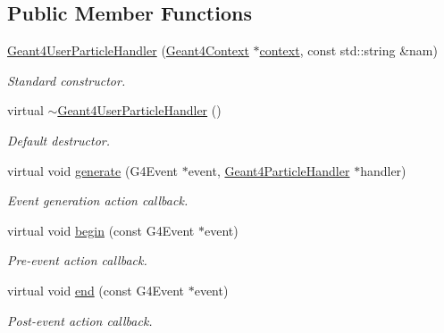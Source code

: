 \subsection*{Public Member Functions}
\begin{DoxyCompactItemize}
\item 
\hyperlink{class_d_d4hep_1_1_simulation_1_1_geant4_user_particle_handler_aed274ebbaf0e9c9a1b336298cdbab183}{Geant4\+User\+Particle\+Handler} (\hyperlink{class_d_d4hep_1_1_simulation_1_1_geant4_context}{Geant4\+Context} $\ast$\hyperlink{class_d_d4hep_1_1_simulation_1_1_geant4_action_aa9d87f0ec2a72b7fc2591b18f98d75cf}{context}, const std\+::string \&nam)
\begin{DoxyCompactList}\small\item\em Standard constructor. \end{DoxyCompactList}\item 
virtual \hyperlink{class_d_d4hep_1_1_simulation_1_1_geant4_user_particle_handler_a0e3bc88e6d3a625600006182d5cdd8c0}{$\sim$\+Geant4\+User\+Particle\+Handler} ()
\begin{DoxyCompactList}\small\item\em Default destructor. \end{DoxyCompactList}\item 
virtual void \hyperlink{class_d_d4hep_1_1_simulation_1_1_geant4_user_particle_handler_abd7d1f82639f33dd16563c4beb936c9e}{generate} (G4\+Event $\ast$event, \hyperlink{class_d_d4hep_1_1_simulation_1_1_geant4_particle_handler}{Geant4\+Particle\+Handler} $\ast$handler)
\begin{DoxyCompactList}\small\item\em Event generation action callback. \end{DoxyCompactList}\item 
virtual void \hyperlink{class_d_d4hep_1_1_simulation_1_1_geant4_user_particle_handler_ad63271464e7ae89e8e7ec0149bc92b93}{begin} (const G4\+Event $\ast$event)
\begin{DoxyCompactList}\small\item\em Pre-\/event action callback. \end{DoxyCompactList}\item 
virtual void \hyperlink{class_d_d4hep_1_1_simulation_1_1_geant4_user_particle_handler_a44c00d22c0fba91cf4a32db049728805}{end} (const G4\+Event $\ast$event)
\begin{DoxyCompactList}\small\item\em Post-\/event action callback. \end{DoxyCompactList}\item 

\end{DoxyCompactItemize}
